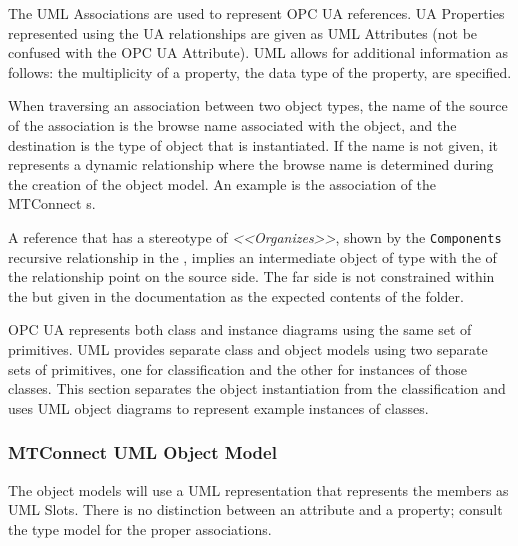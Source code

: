 The UML Associations are used to represent OPC UA references. UA Properties represented using the UA  relationships are given as UML Attributes (not be confused with the OPC UA Attribute). UML allows for additional information as follows:  the multiplicity of a property, the data type of the property, are specified.


\FloatBarrier

When traversing an association between two object types, the name of the source of the association is the browse name associated with the object, and the destination is the type of object that is instantiated. If the name is not given, it represents a dynamic relationship where the browse name is determined during the creation of the object model. An example is the association of the MTConnect s.


\FloatBarrier

A reference that has a stereotype of \textit{<<Organizes>>}, shown by the \texttt{Components} recursive relationship in the , implies an intermediate object of type  with the  of the relationship point on the source side. The far side is not constrained within the  but given in the documentation as the expected contents of the folder.

OPC UA represents both class and instance diagrams using the same set of primitives. UML provides separate class and object models using two separate sets of primitives, one for classification and the other for instances of those classes. This section separates the object instantiation from the classification and uses UML object diagrams to represent example instances of classes.

\FloatBarrier

\subsubsection{MTConnect UML Object Model}

The object models will use a UML representation that represents the members as UML Slots. There is no distinction between an attribute and a property; consult the type model for the proper associations.



